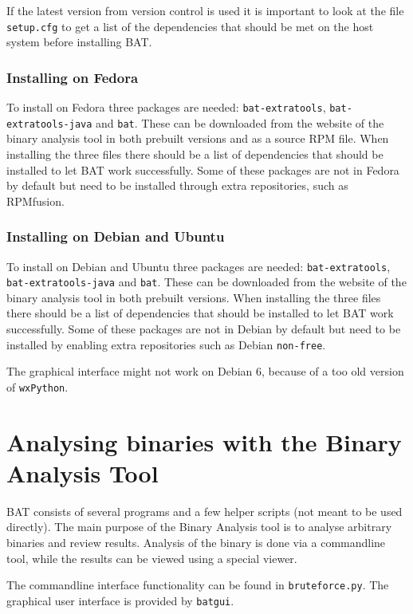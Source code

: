 \documentclass[10pt]{article}
\begin{document}
If the latest version from version control is used it is important to look at
the file \texttt{setup.cfg} to get a list of the dependencies that should be
met on the host system before installing BAT.

\subsubsection{Installing on Fedora}

To install on Fedora three packages are needed:
\texttt{bat-extratools}, \texttt{bat-extratools-java} and \texttt{bat}. These
can be downloaded from the website of the binary analysis tool in both prebuilt
versions and as a source RPM file. When installing the three files there should
be a list of dependencies that should be installed to let BAT work
successfully. Some of these packages are not in Fedora by default but need to
be installed through extra repositories, such as RPMfusion.

\subsubsection{Installing on Debian and Ubuntu}

To install on Debian and Ubuntu three packages are needed:
\texttt{bat-extratools}, \texttt{bat-extratools-java} and \texttt{bat}. These
can be downloaded from the website of the binary analysis tool in both prebuilt
versions. When installing the three files there should be a list of
dependencies that should be installed to let BAT work successfully. Some of
these packages are not in Debian by default but need to be installed by
enabling extra repositories such as Debian \texttt{non-free}.

The graphical interface might not work on Debian 6, because of a too old
version of \texttt{wxPython}.

\section{Analysing binaries with the Binary Analysis Tool}

BAT consists of several programs and a few helper scripts (not meant to be
used directly). The main purpose of the Binary Analysis tool is to analyse
arbitrary binaries and review results. Analysis of the binary is done via
a commandline tool, while the results can be viewed using a special viewer.

The commandline interface functionality can be found in \texttt{bruteforce.py}.
The graphical user interface is provided by \texttt{batgui}.
\end{document}
